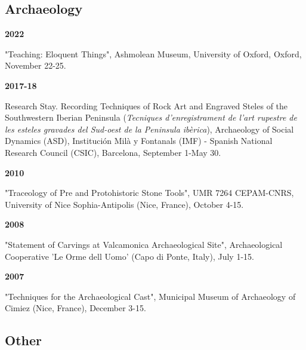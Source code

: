\documentclass{article}
\newcommand{\fr}[1]{} %
\newcommand{\en}[1]{#1}   %
\begin{document}
\smallbreak

\subsection*{\fr{Archéologie}\en{Archaeology}}

\textbf{2022 }
\fr{"Teaching: Eloquent Things", Ashmolean Museum, University of Oxford, Oxford, 22-25 Novembre.}
\en{"Teaching: Eloquent Things", Ashmolean Museum, University of Oxford, Oxford, November 22-25.}

\smallbreak
\textbf{2017-18}
\fr{Séjour de recherche. Techniques d'enregistrement de l'art rupestre et des stèles gravées du sud-ouest de la péninsule ibérique (\textit{Tecniques d'enregistrament de l'art rupestre de les esteles gravades del Sud-oest de la Peninsula ibèrica}), Archéologie des Dynamiques Sociales (ASD), Institución Milà y Fontanals (IMF) - Consejo Superior de Investigaciones Científicas (CSIC), Barcelone, 1er septembre-30 mai.}
\en{Research Stay. Recording Techniques of Rock Art and Engraved Steles of the Southwestern Iberian Peninsula (\textit{Tecniques d'enregistrament de l'art rupestre de les esteles gravades del Sud-oest de la Peninsula ibèrica}), Archaeology of Social Dynamics (ASD), Institución Milà y Fontanals (IMF) - Spanish National Research Council (CSIC), Barcelona, September 1-May 30.}

\smallbreak
\textbf{2010 }
\fr{"Tracéologie des outils en pierre pré et protohistoriques", UMR 7264 CEPAM-CNRS, Université Nice Sophia-Antipolis (Nice, France), 4-15 Octobre.}
\en{"Traceology of Pre and Protohistoric Stone Tools", UMR 7264 CEPAM-CNRS, University of Nice Sophia-Antipolis (Nice, France), October 4-15.}

\smallbreak
\textbf{2008 }
\fr{"Statement of carvings in Valcamonica archaeological site", Coopérative archéologique 'Le Orme dell Uomo' (Capo di Ponte, Italy), 1-15 Juillet.}
\en{"Statement of Carvings at Valcamonica Archaeological Site", Archaeological Cooperative 'Le Orme dell Uomo' (Capo di Ponte, Italy), July 1-15.}

\smallbreak
\textbf{2007 }
\fr{"Technics for the archaeological cast", Musée municipal d'archéologie de Cimiez (Nice, France), 3-15 Décembre.}
\en{"Techniques for the Archaeological Cast", Municipal Museum of Archaeology of Cimiez (Nice, France), December 3-15.}

\smallbreak

\subsection*{\fr{Autres}\en{Other}}
\end{document}
